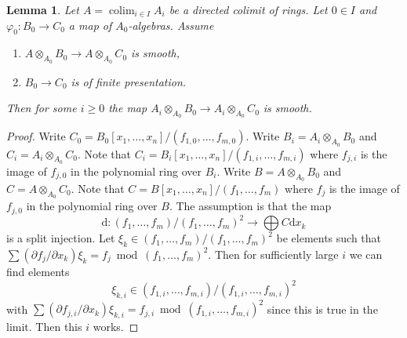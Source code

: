 \documentclass[10pt,a4paper]{amsart}
\theoremstyle{plain}
\newtheorem{lemma}[subsection]{Lemma}
\theoremstyle{definition}
\theoremstyle{remark}
\numberwithin{equation}{subsection}
\def\colim{\mathop{\mathrm{colim}}\nolimits}
\begin{document}
\begin{lemma}
\label{lemma-colimit-smooth}
Let $A = \colim_{i \in I} A_i$ be a directed colimit of rings.
Let $0 \in I$ and $\varphi_0 : B_0 \to C_0$ a map of $A_0$-algebras.
Assume
\begin{enumerate}
\item $A \otimes_{A_0} B_0 \to A \otimes_{A_0} C_0$ is smooth,
\item $B_0 \to C_0$ is of finite presentation.
\end{enumerate}
Then for some $i \geq 0$ the map
$A_i \otimes_{A_0} B_0 \to A_i \otimes_{A_0} C_0$ is smooth.
\end{lemma}

\begin{proof}
Write $C_0 = B_0[x_1, \ldots, x_n]/(f_{1, 0}, \ldots, f_{m, 0})$.
Write $B_i = A_i \otimes_{A_0} B_0$ and $C_i = A_i \otimes_{A_0} C_0$.
Note that $C_i = B_i[x_1, \ldots, x_n]/(f_{1, i}, \ldots, f_{m, i})$
where $f_{j, i}$ is the image of $f_{j, 0}$ in the polynomial ring
over $B_i$. Write $B = A \otimes_{A_0} B_0$ and $C = A \otimes_{A_0} C_0$.
Note that $C = B[x_1, \ldots, x_n]/(f_1, \ldots, f_m)$
where $f_j$ is the image of $f_{j, 0}$ in the polynomial ring
over $B$. The assumption is that the map
$$
\text{d} :
(f_1, \ldots, f_m)/(f_1, \ldots, f_m)^2
\longrightarrow
\bigoplus C \text{d}x_k
$$
is a split injection. Let $\xi_k \in (f_1, \ldots, f_m)/(f_1, \ldots, f_m)^2$
be elements such that $\sum (\partial f_j/\partial x_k) \xi_k =
f_j \bmod (f_1, \ldots, f_m)^2$. Then for sufficiently large $i$ we can
find elements
$$
\xi_{k, i} \in (f_{1, i}, \ldots, f_{m, i})/(f_{1, i}, \ldots, f_{m, i})^2
$$
with $\sum (\partial f_{j, i}/\partial x_k) \xi_{k, i} =
f_{j, i} \bmod (f_{1, i}, \ldots, f_{m, i})^2$
since this is true in the limit. Then this $i$ works.
\end{proof}
\end{document}
